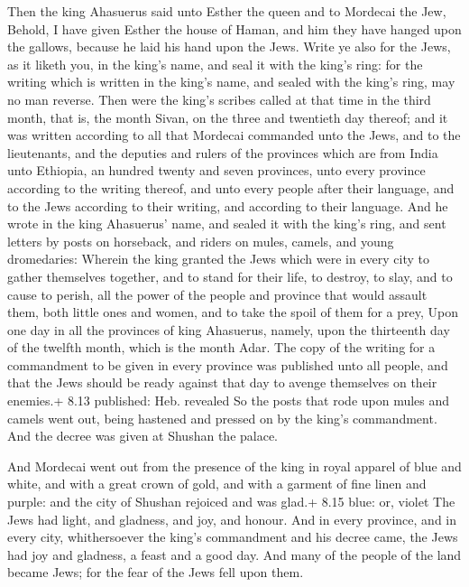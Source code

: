  Then the king Ahasuerus said unto Esther the queen and to
Mordecai the Jew, Behold, I have given Esther the house of Haman, and
him they have hanged upon the gallows, because he laid his hand upon the
Jews.  Write ye also for the Jews, as it liketh you, in the
king's name, and seal it with the king's ring: for the writing which is
written in the king's name, and sealed with the king's ring, may no man
reverse.  Then were the king's scribes called at that time
in the third month, that is, the month Sivan, on the three and twentieth
day thereof; and it was written according to all that Mordecai commanded
unto the Jews, and to the lieutenants, and the deputies and rulers of
the provinces which are from India unto Ethiopia, an hundred twenty and
seven provinces, unto every province according to the writing thereof,
and unto every people after their language, and to the Jews according to
their writing, and according to their language.  And he
wrote in the king Ahasuerus' name, and sealed it with the king's ring,
and sent letters by posts on horseback, and riders on mules, camels, and
young dromedaries:  Wherein the king granted the Jews which
were in every city to gather themselves together, and to stand for their
life, to destroy, to slay, and to cause to perish, all the power of the
people and province that would assault them, both little ones and women,
and to take the spoil of them for a prey,  Upon one day in
all the provinces of king Ahasuerus, namely, upon the thirteenth day of
the twelfth month, which is the month Adar.  The copy of
the writing for a commandment to be given in every province was
published unto all people, and that the Jews should be ready against
that day to avenge themselves on their enemies.+ 8.13 published: Heb.
revealed  So the posts that rode upon mules and camels went
out, being hastened and pressed on by the king's commandment. And the
decree was given at Shushan the palace.

 And Mordecai went out from the presence of the king in
royal apparel of blue and white, and with a great crown of gold, and
with a garment of fine linen and purple: and the city of Shushan
rejoiced and was glad.+ 8.15 blue: or, violet  The Jews had
light, and gladness, and joy, and honour.  And in every
province, and in every city, whithersoever the king's commandment and
his decree came, the Jews had joy and gladness, a feast and a good day.
And many of the people of the land became Jews; for the fear of the Jews
fell upon them.

